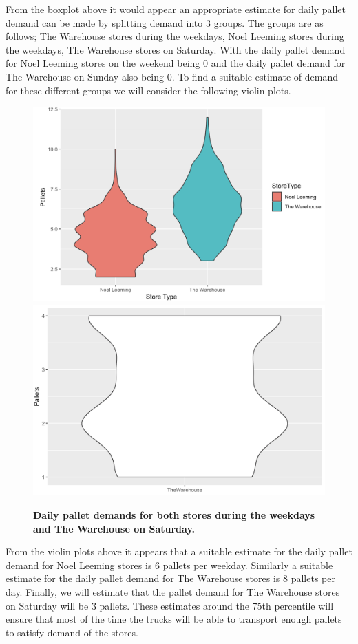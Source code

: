 \documentclass[11pt, a4paper]{article}   	%
\begin{document}
\noindent From the boxplot above it would appear an appropriate estimate for daily pallet demand can be made by splitting demand into 3 groups. The groups are as follows; The Warehouse stores during the weekdays, Noel Leeming stores during the weekdays, The Warehouse stores on Saturday. With the daily pallet demand for Noel Leeming stores on the weekend being 0 and the daily pallet demand for The Warehouse on Sunday also being 0. To find a suitable estimate of demand for these different groups we will consider the following violin plots.
\begin{figure}[H]\centering
\includegraphics[scale=.3]{D5}
\includegraphics[scale=.3]{D6}
\caption{\textbf{Daily pallet demands for both stores during the weekdays and The Warehouse on Saturday.}}
\end{figure}

\noindent From the violin plots above it appears that a suitable estimate for the daily pallet demand for Noel Leeming stores is 6 pallets per weekday. Similarly a suitable estimate for the daily pallet demand for The Warehouse stores is 8 pallets per day. Finally, we will estimate that the pallet demand for The Warehouse stores on Saturday will be 3 pallets. These estimates around the 75th percentile will ensure that most of the time the trucks will be able to transport enough pallets to satisfy demand of the stores.  \\
\end{document}
